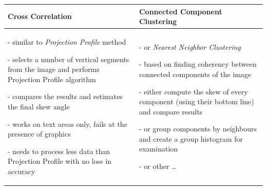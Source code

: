 \begin{longtable}{p{19em}p{19em}}
\textbf{Cross Correlation} & \textbf{Connected Component Clustering}\\
\midrule

- similar to \emph{Projection Profile} method

- selects a number of vertical segments from the image and performs Projection Profile algorithm

- compares the results and estimates the final skew angle

- works on text areas only, fails at the presence of graphics

- needs to process less data than Projection Profile with no loss in accuracy
&

- or \emph{Nearest Neighbor Clustering} \citep{skewClustering}

- based on finding coherency between connected components of the image

- either compute the skew of every component (using their bottom line) and compare results

- or group components by neighbours and create a group histogram for examination

- or other \ldots

\end{longtable}

